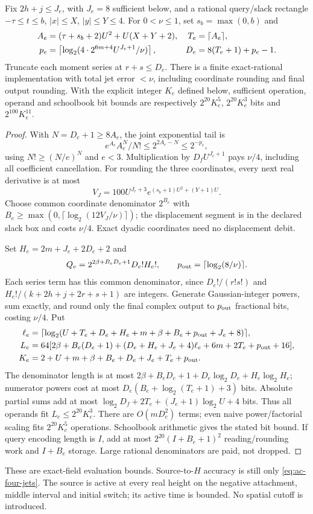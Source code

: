 \begin{theorem}\label{thm:ev-source}
Fix $2h+j\le J_e$, with $J_e=8$ sufficient below, and a rational
query/slack rectangle $-\tau\le t\le b$, $|x|\le X$, $|y|\le Y\le4$.
For $0<\nu\le1$, set $s_b=\max(0,b)$ and
\begin{align}
 A_e&=(\tau+s_b+2)U^2+U(X+Y+2),&T_e&=\lceil A_e\rceil,\notag\\
 p_e&=\left\lceil\log_2(4\cdot2^{6m+4}U^{J_e+1}/\nu)\right\rceil,
 &D_e&=8(T_e+1)+p_e-1.
 \label{eq:ev-truncation}
\end{align}
Truncate each moment series at $r+s\le D_e$. There is a finite
exact-rational implementation with total jet error $<\nu$, including
coordinate rounding and final output rounding. With the explicit
integer $K_e$ defined below, sufficient operation, operand and
schoolbook bit bounds are respectively
$2^{20}K_e^5$, $2^{20}K_e^3$ bits and $2^{100}K_e^{11}$.
\end{theorem}
\begin{proof}
With $N=D_e+1\ge8A_e$, the joint exponential tail is
\[
 e^{A_e}A_e^N/N!\le2^{2A_e-N}\le2^{-p_e},
\]
using $N!\ge(N/e)^N$ and $e<3$. Multiplication by
$D_fU^{J_e+1}$ pays $\nu/4$, including all coefficient cancellation.
For rounding the three coordinates, every next real derivative is at
most
\[
 V_J=100U^{J_e+3}e^{(s_b+1)U^2+(Y+1)U}.
\]
Choose common coordinate denominator $2^{B_e}$ with
$B_e\ge\max(0,\lceil\log_2(12V_J/\nu)\rceil)$;
the displacement segment is in the declared slack box and costs
$\nu/4$. Exact dyadic coordinates need no displacement debit.

Set $H_e=2m+J_e+2D_e+2$ and
\[
 Q_e=2^{2\beta+B_eD_e+1}D_e!H_e!,\qquad
 p_{\rm out}=\lceil\log_2(8/\nu)\rceil.
\]
Each series term has this common denominator, since
$D_e!/(r!s!)$ and $H_e!/(k+2h+j+2r+s+1)$ are integers.
Generate Gaussian-integer powers, sum exactly, and round only the final
complex output to $p_{\rm out}$ fractional bits, costing $\nu/4$.
Put
\begin{align*}
 \ell_e&=\lceil\log_2(U+T_e+D_e+H_e+m+\beta+B_e+p_{\rm out}+J_e+8)\rceil,\\
 L_e&=64[2\beta+B_e(D_e+1)+(D_e+H_e+J_e+4)\ell_e
                      +6m+2T_e+p_{\rm out}+16],\\
 K_e&=2+U+m+\beta+B_e+D_e+J_e+T_e+p_{\rm out}.
\end{align*}
The denominator length is at most
$2\beta+B_eD_e+1+D_e\log_2D_e+H_e\log_2H_e$;
numerator powers cost at most
$D_e(B_e+\log_2(T_e+1)+3)$ bits. Absolute partial sums add at most
$\log_2D_f+2T_e+(J_e+1)\log_2U+4$ bits. Thus all operands fit
$L_e\le2^{20}K_e^3$. There are $O(mD_e^2)$ terms; even naive
power/factorial scaling fits $2^{20}K_e^5$ operations. Schoolbook
arithmetic gives the stated bit bound. If query encoding length is
$I$, add at most $2^{20}(I+B_e+1)^2$ reading/rounding work and
$I+B_e$ storage. Large rational denominators are paid, not dropped.
\end{proof}
These are exact-field evaluation bounds. Source-to-$H$ accuracy is
still only \eqref{eq:ac-four-jets}. The source is active at every
real height on the negative attachment, middle interval and initial
switch; its active time is bounded. No spatial cutoff is introduced.

